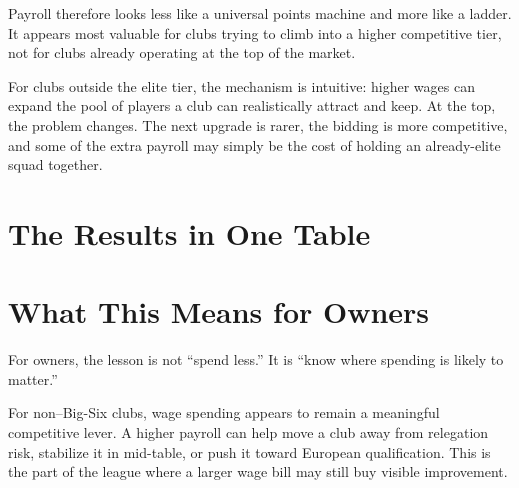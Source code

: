 \documentclass[12pt]{article}
\begin{document}
Payroll therefore looks less like a universal points machine and more like a ladder. It appears most valuable for clubs trying to climb into a higher competitive tier, not for clubs already operating at the top of the market.

For clubs outside the elite tier, the mechanism is intuitive: higher wages can expand the pool of players a club can realistically attract and keep. At the top, the problem changes. The next upgrade is rarer, the bidding is more competitive, and some of the extra payroll may simply be the cost of holding an already-elite squad together.

\section{The Results in One Table}

\begin{table}[H]
\centering
\caption*{\textbf{Payroll matters most outside the Big Six}}
\end{table}

\section{What This Means for Owners}

For owners, the lesson is not ``spend less.'' It is ``know where spending is likely to matter.''

For non--Big-Six clubs, wage spending appears to remain a meaningful competitive lever. A higher payroll can help move a club away from relegation risk, stabilize it in mid-table, or push it toward European qualification. This is the part of the league where a larger wage bill may still buy visible improvement.
\end{document}

